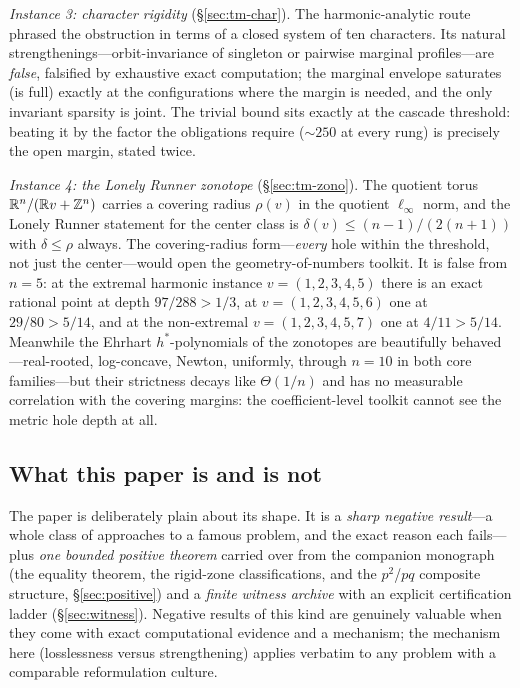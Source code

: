 \emph{Instance 3: character rigidity} (\S\ref{sec:tm-char}). The
harmonic-analytic route phrased the obstruction in terms of a closed
system of ten characters. Its natural strengthenings---orbit-invariance
of singleton or pairwise marginal profiles---are \emph{false}, falsified
by exhaustive exact computation; the marginal envelope saturates (is
full) exactly at the configurations where the margin is needed, and the
only invariant sparsity is joint. The trivial bound sits exactly at the
cascade threshold: beating it by the factor the obligations require
($\sim\!250$ at every rung) is precisely the open margin, stated twice.

\emph{Instance 4: the Lonely Runner zonotope}
(\S\ref{sec:tm-zono}). The quotient torus $\mathbb{R}^n/(\mathbb{R} v+\mathbb{Z}^n)$ carries a
covering radius $\rho(v)$ in the quotient $\ell_\infty$ norm, and the
Lonely Runner statement for the center class is
$\delta(v)\le (n{-}1)/(2(n{+}1))$ with $\delta\le\rho$ always. The
covering-radius form---\emph{every} hole within the threshold, not just
the center---would open the geometry-of-numbers toolkit. It is false from
$n=5$: at the extremal harmonic instance $v=(1,2,3,4,5)$ there is an
exact rational point at depth $97/288>1/3$, at $v=(1,2,3,4,5,6)$ one at
$29/80>5/14$, and at the non-extremal $v=(1,2,3,4,5,7)$ one at
$4/11>5/14$. Meanwhile the Ehrhart $h^*$-polynomials of the zonotopes
are beautifully behaved---real-rooted, log-concave, Newton, uniformly,
through $n=10$ in both core families---but their strictness decays like
$\Theta(1/n)$ and has no measurable correlation with the covering
margins: the coefficient-level toolkit cannot see the metric hole depth
at all.

\subsection{What this paper is and is not}

The paper is deliberately plain about its shape. It is a \emph{sharp
negative result}---a whole class of approaches to a famous problem, and
the exact reason each fails---plus \emph{one bounded positive theorem}
carried over from the companion monograph (the equality theorem, the
rigid-zone classifications, and the $p^2$/$pq$ composite structure,
\S\ref{sec:positive}) and a \emph{finite witness archive} with an explicit
certification ladder (\S\ref{sec:witness}). Negative results of this kind
are genuinely valuable when they come with exact computational evidence
and a mechanism; the mechanism here (losslessness versus strengthening)
applies verbatim to any problem with a comparable reformulation culture.

